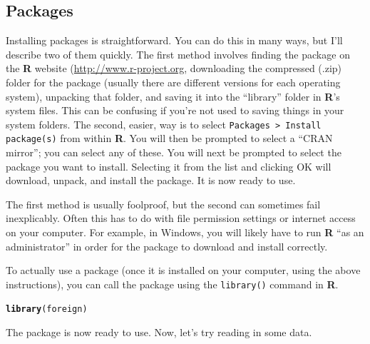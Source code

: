 \documentclass[12pt]{article}\usepackage[]{graphicx}\usepackage[]{color}
\makeatletter
\newcommand{\hlstd}[1]{\textcolor[rgb]{0.345,0.345,0.345}{#1}}%
\newcommand{\hlkwd}[1]{\textcolor[rgb]{0.737,0.353,0.396}{\textbf{#1}}}%
\newenvironment{kframe}{%
 \def\at@end@of@kframe{}%
 \ifinner\ifhmode%
  \def\at@end@of@kframe{\end{minipage}}%
  \begin{minipage}{\columnwidth}%
 \fi\fi%
 \def\FrameCommand##1{\hskip\@totalleftmargin \hskip-\fboxsep
 \colorbox{shadecolor}{##1}\hskip-\fboxsep
     \hskip-\linewidth \hskip-\@totalleftmargin \hskip\columnwidth}%
 \MakeFramed {\advance\hsize-\width
   \@totalleftmargin\z@ \linewidth\hsize
   \@setminipage}}%
 {\par\unskip\endMakeFramed%
 \at@end@of@kframe}
\newenvironment{knitrout}{}{} %
\makeatother
\begin{document}
\subsection{Packages}
Installing packages is straightforward. You can do this in many ways, but I'll describe two of them quickly. The first method involves finding the package on the \textbf{R} website (\url{http://www.r-project.org}, downloading the compressed (.zip) folder for the package (usually there are different versions for each operating system), unpacking that folder, and saving it into the ``library'' folder in \textbf{R}'s system files. This can be confusing if you're not used to saving things in your system folders. The second, easier, way is to select \verb|Packages > Install package(s)| from within \textbf{R}. You will then be prompted to select a ``CRAN mirror''; you can select any of these. You will next be prompted to select the package you want to install. Selecting it from the list and clicking OK will download, unpack, and install the package. It is now ready to use.

The first method is usually foolproof, but the second can sometimes fail inexplicably. Often this has to do with file permission settings or internet access on your computer. For example, in Windows, you will likely have to run \textbf{R} ``as an administrator'' in order for the package to download and install correctly.

To actually use a package (once it is installed on your computer, using the above instructions), you can call the package using the \verb|library()| command in \textbf{R}.
\begin{knitrout}
\color{fgcolor}\begin{kframe}
\begin{alltt}
\hlkwd{library}\hlstd{(foreign)}
\end{alltt}
\end{kframe}
\end{knitrout}

The package is now ready to use. Now, let's try reading in some data.
\end{document}
